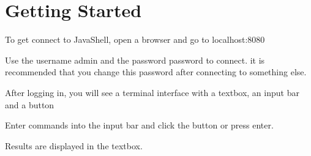 \hypertarget{group__GettingStarted}{}\section{Getting Started}
\label{group__GettingStarted}
To get connect to Java\+Shell, open a browser and go to localhost\+:8080

Use the username admin and the password password to connect. it is recommended that you change this password after connecting to something else.

After logging in, you will see a terminal interface with a textbox, an input bar and a button

Enter commands into the input bar and click the button or press enter.

Results are displayed in the textbox. 